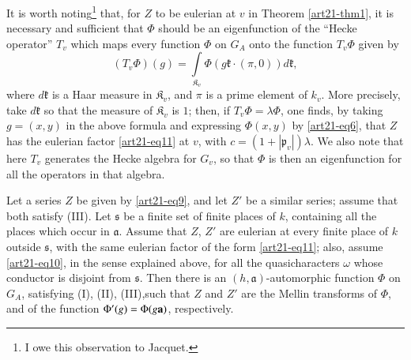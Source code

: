 It is worth noting\footnote[1]{I owe this observation to Jacquet.} that, for $Z$ to be eulerian at $v$ in Theorem \ref{art21-thm1}, it is necessary and sufficient that $\Phi$ should be an eigenfunction of the ``Hecke operator'' $T_{v}$ which maps every function $\Phi$ on $G_{A}$ onto the function $T_{v}\Phi$ given by
$$
(T_{v}\Phi)(g)=\int\limits_{\mathfrak{K}_{v}}\Phi(g\mathfrak{k}\cdot (\pi, 0))d\mathfrak{k},
$$
where $d\mathfrak{k}$ is a Haar measure in $\mathfrak{K}_{v}$, and $\pi$ is a prime element of $k_{v}$. More precisely, take $d\mathfrak{k}$ so that the measure of $\mathfrak{K}_{v}$ is $1$; then, if $T_{v}\Phi=\lambda\Phi$, one finds, by taking $g=(x,y)$ in the above formula and expressing $\Phi(x,y)$ by \eqref{art21-eq6}, that $Z$ has the eulerian factor \eqref{art21-eq11} at $v$, with $c=(1+|\mathfrak{p}_{v}|)\lambda$. We also note that here $T_{v}$ generates the Hecke algebra for $G_{v}$, so that $\Phi$ is then an eigenfunction for all the operators in that algebra.

\begin{theorem}\label{art21-thm2}
Let a series $Z$ be given by \eqref{art21-eq9}, and let $Z'$ be a similar series; assume that both satisfy {\rm(III)}. Let $\mathfrak{s}$ be a finite set of finite places of $k$, containing all the places which occur in $\mathfrak{a}$. Assume that $Z$, $Z'$ are eulerian at every finite place of $k$ outside $\mathfrak{s}$, with the same eulerian factor of the form \eqref{art21-eq11}; also, assume \eqref{art21-eq10}, in the sense explained above, for all the quasicharacters $\omega$ whose conductor is disjoint from $\mathfrak{s}$. Then there is an $(h,\mathfrak{a})$-automorphic function $\Phi$ on $G_{A}$, satisfying {\rm(I), (II), (III),}\pageoriginale such that $Z$ and $Z'$ are the Mellin transforms of $\Phi$, and of the function $\Phi'(g)=\Phi(g\mathbf{a})$, respectively.
\end{theorem}


